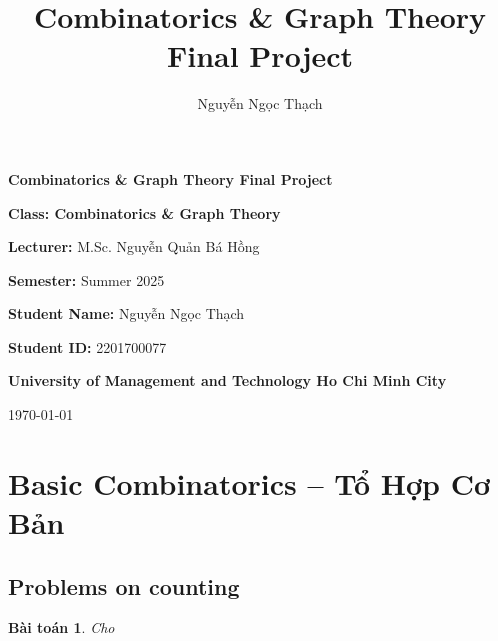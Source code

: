 \documentclass{article}
\title{Combinatorics & Graph Theory Final Project}
\author{Nguyễn Ngọc Thạch}
\date{}
\newtheorem{baitoan}{Bài toán}
\begin{document}
\begin{titlepage}
    \centering
    \vspace*{2cm}
    \LARGE\textbf{Combinatorics \& Graph Theory Final Project}
    \vspace{1.5cm}

    \large\textbf{Class: Combinatorics \& Graph Theory}

    \vspace{0.5cm}

    \textbf{Lecturer:} M.Sc. Nguyễn Quản Bá Hồng

    \vspace{0.5cm}

    \textbf{Semester:} Summer 2025
    
    \vspace{1.5cm}

    \textbf{Student Name:} Nguyễn Ngọc Thạch

    \vspace{0.5cm}

    \textbf{Student ID:} 2201700077

    \vspace{1.5cm}

    \textbf{University of Management and Technology Ho Chi Minh City}

    \vfill

    \large\today
\end{titlepage}

\newpage

\section{Basic Combinatorics -- Tổ Hợp Cơ Bản}

\subsection{Problems on counting}

\begin{baitoan}
	Cho
\end{baitoan}
\end{document}

